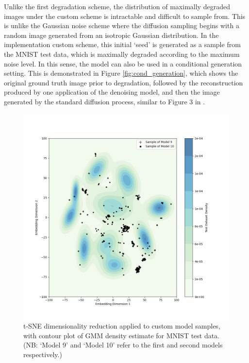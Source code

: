 \documentclass[12pt]{article}
\begin{document}
Unlike the first degradation scheme, the distribution of maximally degraded images under the custom scheme is intractable and difficult to sample from.
This is unlike the Gaussian noise scheme where the diffusion sampling begins with a random image generated from an isotropic Gaussian distribution.
In the implementation custom scheme, this initial `seed' is generated as a sample from the MNIST test data, which is maximally degraded according to the maximum noise level.
In this sense, the model can also be used in a conditional generation setting.
This is demonstrated in Figure \ref{fig:cond_generation}, which shows the original ground truth image prior to degradation,
followed by the reconstruction produced by one application of the denoising model,
and then the image generated by the standard diffusion process, similar to Figure 3 in \cite{bansal2022cold}.

\begin{figure}[hp]
    \includegraphics[scale=0.54, center]{figures/tsne_custom_models.png}
    \caption{t-SNE dimensionality reduction applied to custom model samples, with contour plot of GMM density estimate for MNIST test data. (NB: `Model 9' and `Model 10' refer to the first and second models respectively.)}
    \label{fig:tsne_custom}
\end{figure}
\end{document}

